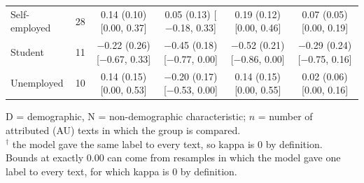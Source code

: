 \begin{table}[t]
\begin{tabular}{@{}lr*{4}{c}@{}}
\quad Self-employed & 28 & \makecell{0.14 (0.10)\\ {[}0.00, 0.37{]}} & \makecell{0.05 (0.13)\\ {[}$-$0.18, 0.33{]}} & \makecell{0.19 (0.12)\\ {[}0.00, 0.46{]}} & \makecell{0.07 (0.05)\\ {[}0.00, 0.19{]}} \\
\quad Student & 11 & \makecell{$-$0.22 (0.26)\\ {[}$-$0.67, 0.33{]}} & \makecell{$-$0.45 (0.18)\\ {[}$-$0.77, 0.00{]}} & \makecell{$-$0.52 (0.21)\\ {[}$-$0.86, 0.00{]}} & \makecell{$-$0.29 (0.24)\\ {[}$-$0.75, 0.16{]}} \\
\quad Unemployed & 10 & \makecell{0.14 (0.15)\\ {[}0.00, 0.53{]}} & \makecell{$-$0.20 (0.17)\\ {[}$-$0.53, 0.00{]}} & \makecell{0.14 (0.15)\\ {[}0.00, 0.55{]}} & \makecell{0.02 (0.06)\\ {[}0.00, 0.16{]}} \\
\bottomrule
\end{tabular}
\par\smallskip
\begin{minipage}{\linewidth}
\footnotesize
D = demographic, N = non-demographic characteristic; $n$ = number of attributed (\ac{AU}) texts in which the group is compared. \\
$^\dagger$ the model gave the same label to every text, so kappa is 0 by definition. \\
Bounds at exactly 0.00 can come from resamples in which the model gave one label to every text, for which kappa is 0 by definition.
\end{minipage}
\end{table}
